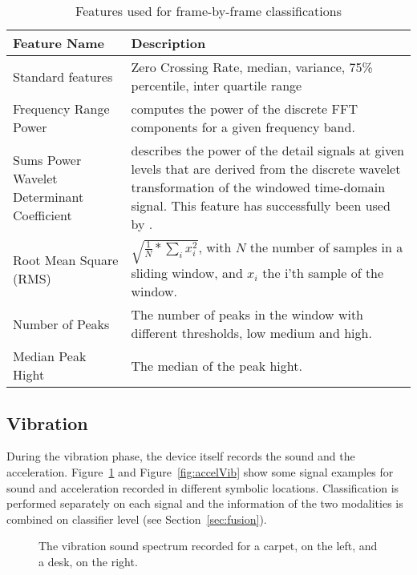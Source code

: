 \begin{table}[ht]
\caption{Features used for frame-by-frame classifications}
\begin{center}
\begin{tabularx}{\textwidth}{XX}
\toprule
Feature Name& Description\\
\midrule 
Standard features& Zero Crossing Rate, median, variance, 75\% percentile, inter quartile range\\
\midrule 
Frequency Range Power& computes the power of the discrete FFT components for a given frequency band. \\
\midrule 
Sums Power Wavelet Determinant Coefficient 
& describes the power of the detail signals at given levels that are derived from the discrete wavelet transformation of the windowed time-domain signal. This feature has successfully been used by \cite{sekine2000}. \\
\midrule 
Root Mean Square (RMS)&$\sqrt{\frac{1}{N}*\sum_i{x_i^2}}$, with $N$
the number of samples in a sliding window, and $x_i$ the i'th sample of the window.\\
\midrule 
Number of Peaks& The number of peaks in the window with different thresholds, low medium and high.\\
\midrule 
Median Peak Hight& The median of the peak hight. \\
\bottomrule
\end{tabularx}
 \label{table:features}
\end{center}
\end{table}

\subsection{Vibration}
During the vibration phase, the device itself records the sound and the
acceleration. Figure~\ref{fig:soundVib} and Figure~\ref{fig:accelVib} show some signal examples for
sound and acceleration recorded in different symbolic locations. Classification is performed separately on
each signal and the information of the two
modalities is combined on classifier level (see Section~\ref{sec:fusion}).


\begin{figure}[t]
  \begin{center}
   \end{center}
\vspace{-10pt}
\caption[Sample vibration sound spectrum]{
The vibration sound spectrum recorded for a carpet, on the left, and a desk, on the right.}
\label{fig:soundVib}
\vspace{-10pt}
\end{figure} 

